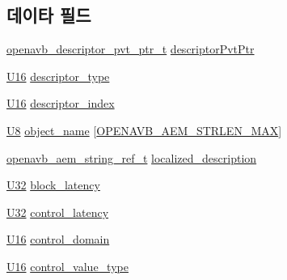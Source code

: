 \subsection*{데이타 필드}
\begin{DoxyCompactItemize}
\item 
\hyperlink{openavb__aem__pub_8h_a85eabab4b7d2466e94c1c3b43b11371d}{openavb\+\_\+descriptor\+\_\+pvt\+\_\+ptr\+\_\+t} \hyperlink{structopenavb__aem__descriptor__control__t_a302e92fd6cf4d398d5305395359fb157}{descriptor\+Pvt\+Ptr}
\item 
\hyperlink{openavb__types__base__pub_8h_a0a0a322d5fa4a546d293a77ba8b4a71f}{U16} \hyperlink{structopenavb__aem__descriptor__control__t_a1e231d7874aada5925b29affc76782cc}{descriptor\+\_\+type}
\item 
\hyperlink{openavb__types__base__pub_8h_a0a0a322d5fa4a546d293a77ba8b4a71f}{U16} \hyperlink{structopenavb__aem__descriptor__control__t_ab26fb363c24b9a2a4391f9171c981b08}{descriptor\+\_\+index}
\item 
\hyperlink{openavb__types__base__pub_8h_aa63ef7b996d5487ce35a5a66601f3e73}{U8} \hyperlink{structopenavb__aem__descriptor__control__t_a5e98aba8105a7a6d82fac41816c83da3}{object\+\_\+name} \mbox{[}\hyperlink{openavb__aem__types__pub_8h_ab2bb82e9f856a76b8305e4864f23ee58}{O\+P\+E\+N\+A\+V\+B\+\_\+\+A\+E\+M\+\_\+\+S\+T\+R\+L\+E\+N\+\_\+\+M\+AX}\mbox{]}
\item 
\hyperlink{structopenavb__aem__string__ref__t}{openavb\+\_\+aem\+\_\+string\+\_\+ref\+\_\+t} \hyperlink{structopenavb__aem__descriptor__control__t_afd613361c59409fb6dcc0c237d1cfbfd}{localized\+\_\+description}
\item 
\hyperlink{openavb__types__base__pub_8h_a696390429f2f3b644bde8d0322a24124}{U32} \hyperlink{structopenavb__aem__descriptor__control__t_ac8dd29fd39cc138a898f39f7baa876ae}{block\+\_\+latency}
\item 
\hyperlink{openavb__types__base__pub_8h_a696390429f2f3b644bde8d0322a24124}{U32} \hyperlink{structopenavb__aem__descriptor__control__t_abef1766e6d00e7e0f5136b820b271bb6}{control\+\_\+latency}
\item 
\hyperlink{openavb__types__base__pub_8h_a0a0a322d5fa4a546d293a77ba8b4a71f}{U16} \hyperlink{structopenavb__aem__descriptor__control__t_a0cbc0c2de32138908232359750e2e863}{control\+\_\+domain}
\item 
\hyperlink{openavb__types__base__pub_8h_a0a0a322d5fa4a546d293a77ba8b4a71f}{U16} \hyperlink{structopenavb__aem__descriptor__control__t_ace2d194568aa6de8cab3ef0324f34579}{control\+\_\+value\+\_\+type}

\end{DoxyCompactItemize}
